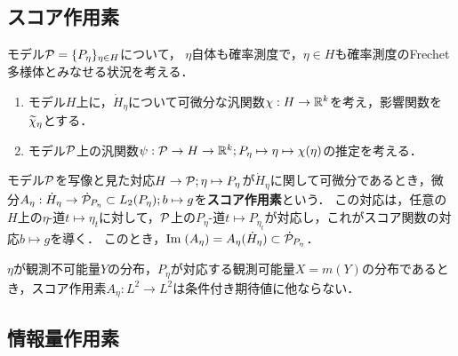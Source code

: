 \documentclass[uplatex,dvipdfmx]{jsreport}
\begin{document}
\subsection{スコア作用素}

\begin{notation}
    モデル$\P=\{P_\eta\}_{\eta\in H}$について，
    $\eta$自体も確率測度で，$\eta\in H$も確率測度のFrechet多様体とみなせる状況を考える．
    \begin{enumerate}
        \item モデル$H$上に，$\dot{H}_\eta$について可微分な汎関数$\chi:H\to\R^k$を考え，影響関数を$\wt{\chi}_\eta$とする．
        \item モデル$\P$上の汎関数$\psi:\P\to H\to\R^k;P_\eta\mapsto\eta\mapsto\chi(\eta)$の推定を考える．
    \end{enumerate}
\end{notation}

\begin{definition}
    モデル$\P$を写像と見た対応$H\to\P;\eta\mapsto P_\eta$が$\dot{H}_\eta$に関して可微分であるとき，微分$A_\eta:\dot{H}_\eta\to\dot{\P}_{P_\eta}\subset L_2(P_\eta);b\mapsto g$を\textbf{スコア作用素}という．
    この対応は，任意の$H$上の$\eta$-道$t\mapsto\eta_t$に対して，$\P$上の$P_\eta$-道$t\mapsto P_{\eta_t}$が対応し，これがスコア関数の対応$b\mapsto g$を導く．
    このとき，$\Im(A_\eta)=A_\eta(\dot{H}_\eta)\subset\dot{\P}_{P_\eta}$．
\end{definition}
\begin{example}
    $\eta$が観測不可能量$Y$の分布，$P_\eta$が対応する観測可能量$X=m(Y)$の分布であるとき，スコア作用素$A_\eta:L^2\to L^2$は条件付き期待値に他ならない．
\end{example}

\subsection{情報量作用素}
\end{document}
